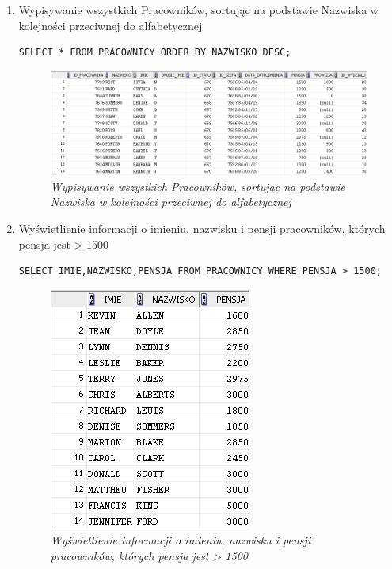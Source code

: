 \documentclass[a4paper, 10pt]{article}
\begin{document}
\begin{enumerate}
\item Wypisywanie wszystkich Pracowników, sortując na podstawie Nazwiska w kolejności przeciwnej do alfabetycznej
\begin{lstlisting}[style=SQL, caption=\textit{Wypisywanie wszystkich Pracowników, sortując na podstawie Nazwiska w kolejności przeciwnej do alfabetycznej}]
SELECT * FROM PRACOWNICY ORDER BY NAZWISKO DESC;
\end{lstlisting}

\begin{figure}[H]
	\centering
	\includegraphics[scale=0.7]{zadanie3.png}
	\caption{\textit{Wypisywanie wszystkich Pracowników, sortując na podstawie Nazwiska w kolejności przeciwnej do alfabetycznej}}
	\label{fig:nazwisko_sort_desc}
\end{figure}

\item Wyświetlienie informacji o imieniu, nazwisku i pensji pracowników, których pensja jest > 1500
\begin{lstlisting}[style=SQL, caption=\textit{Wyświetlienie informacji o imieniu, nazwisku i pensji pracowników, których pensja jest > 1500}]
SELECT IMIE,NAZWISKO,PENSJA FROM PRACOWNICY WHERE PENSJA > 1500;
\end{lstlisting}

\begin{figure}[H]
	\centering
	\includegraphics[scale=0.7]{zadanie4.png}
	\caption{\textit{Wyświetlienie informacji o imieniu, nazwisku i pensji pracowników, których pensja jest > 1500}}
	\label{fig:pensja_1500}
\end{figure}



\end{enumerate}
\end{document}
